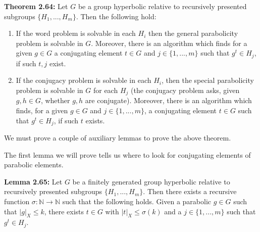 \documentclass[12pt]{article}
\newcommand{\vs}{\vskip10pt}
\begin{document}
	\vs 
	
	\textbf{Theorem 2.64: } Let $G$ be a group hyperbolic relative to recursively presented subgroups $\{H_1,...,H_m\}$. Then the following hold: 
	
	\begin{enumerate}[label = (\alph*)]
		\item If the word problem is solvable in each $H_i$ then the general parabolicity problem is solvable in $G$. Moreover, there is an algorithm which finds for a given $g \in G$ a conjugating element $t \in G$ and $j \in \{1,...,m\}$ such that $g^t \in H_j$, if such $t,j$ exist. 
		\item If the conjugacy problem is solvable in each $H_i$, then the special parabolicity problem is solvable in $G$ for each $H_j$ (the conjugacy problem asks, given $g,h \in G$, whether $g,h$ are conjugate). Moreover, there is an algorithm which finds, for a given $g \in G$ and $j \in \{1,...,m\}$, a conjugating element $t \in G$ such that $g^t \in H_j$, if such $t$ exists. 
	\end{enumerate}

	We must prove a couple of auxiliary lemmas to prove the above theorem.
	
	\vs 
	
	The first lemma we will prove tells us where to look for conjugating elements of parabolic elements. 
	
	\vs 
	
	\textbf{Lemma 2.65: } Let $G$ be a finitely generated group hyperbolic relative to recursively presented subgroups $\{H_1,...,H_m\}$. Then there exists a recursive function $\sigma: \mathbb{N} \rightarrow \mathbb{N}$ such that the following holds. Given a parabolic $g \in G$ such that $\vert g \vert_X \leq k$, there exists $t \in G$ with $\vert t \vert_X \leq \sigma(k)$ and a $j \in \{1,...,m\}$ such that $g^t \in H_j$.
	
\end{document}
